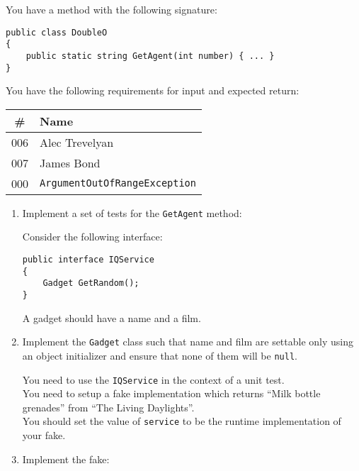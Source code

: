 
\pgfmathsetmacro{}

\noindent You have a method with the following signature:
\begin{lstlisting}
public class DoubleO
{
    public static string GetAgent(int number) { ... }
}
\end{lstlisting}
\noindent You have the following requirements for input and expected return:
\begin{center}
\begin{tabular}{ c l }
    \# & Name \\
    \hline
    006 & Alec Trevelyan \\
    007 & James Bond \\
    000 & \texttt{ArgumentOutOfRangeException} \\
    \hline
\end{tabular}
\end{center}





\vskip 15pt
\begin{enumerate}[a]
    \item {} Implement a set of tests for the \texttt{GetAgent} method:
		
\def\questionTenAnswerB{answers/code/q10_answerB} %
\def\questionTenAnswerC{answers/code/q10_answerC} %





\newpage
\noindent Consider the following interface:
\begin{lstlisting}
public interface IQService
{
    Gadget GetRandom();
}
\end{lstlisting}
\noindent A gadget should have a name and a film.




\vskip 15pt
    \item {} Implement the \texttt{Gadget} class such that name and film are settable only using an object initializer and ensure that none of them will be \texttt{null}.
		
\def\questionTenAnswerC{answers/code/q10_answerC} %




\noindent You need to use the \texttt{IQService} in the context of a unit test.\\
\noindent You need to setup a fake implementation which returns ``Milk bottle grenades'' from ``The Living Daylights''.\\
\noindent You should set the value of \texttt{service} to be the runtime implementation of your fake.





\vskip 15pt
    \item {} Implement the fake:
		

\end{enumerate}

